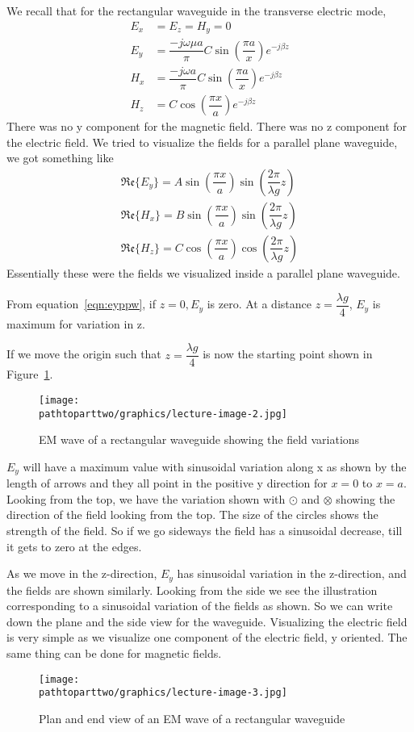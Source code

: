 We recall that for the rectangular waveguide in the transverse electric mode,
\begin{align*}
E_{x} &= E_{z} = H_{y} = 0\\
E_{y} &= \dfrac{-j\omega\mu a }{\pi} C\sin(\dfrac{\pi a}{x}) e ^{-j\beta z}\\
H_{x} &= \dfrac{-j\omega a}{\pi} C \sin(\dfrac{\pi a}{x})e^{-j\beta z} \\
H_{z} &= C\cos(\dfrac{\pi x}{a}) e^{-j\beta z}
\end{align*}
There was no y component for the magnetic field. There was no z component for the electric field. We tried to visualize the fields for a parallel plane waveguide, we got something like 
\begin{align}
\mathfrak{Re}\{E_{y}\} = A\sin(\dfrac{\pi x}{a})\sin(\dfrac{2\pi}{\lambda g}z)
\label{eqn:eyppw}\\
\mathfrak{Re}\{H_{x}\} = B\sin(\dfrac{\pi x}{a})\sin(\dfrac{2\pi}{\lambda g}z)\\
\mathfrak{Re}\{H_{z}\} = C\cos(\dfrac{\pi x}{a})\cos(\dfrac{2\pi}{\lambda g}z)
\end{align}
Essentially these were the fields we visualized inside a parallel plane waveguide.

From equation~\ref{eqn:eyppw}, if $z = 0, E_{y}$ is zero. At a distance $ z = \dfrac{\lambda g}{4}$, $E_{y}$ is maximum for variation in z.

If we move the origin such that $z = \dfrac{\lambda g}{4}$ is now the starting point shown in Figure~\ref{fig:lectureimage2}.
\begin{figure}[h]
\centering
\texttt{[image: \\pathtoparttwo/graphics/lecture-image-2.jpg]}
\label{fig:lectureimage2}
\caption{EM wave of a rectangular waveguide showing the field variations}
\end{figure}
$E_{y}$ will have a maximum value with sinusoidal variation along x as shown by the length of arrows and they all point in the positive y direction for $x = 0$ to $x = a$. Looking from the top, we have the variation shown with $\odot$ and $\otimes$ showing the direction of the field looking from the top. The size of the circles shows the strength of the field. So if we go sideways the field has a sinusoidal decrease, till it gets to zero at the edges.
 
As we move in the z-direction, $E_{y}$ has sinusoidal variation in the z-direction, and the fields are shown similarly. Looking from the side we see the illustration corresponding to a sinusoidal variation of the fields as shown. So we can write down the plane and the side view for the waveguide. Visualizing the electric field is very simple as we visualize one component of the electric field, y oriented. The same thing can be done for magnetic fields.
\begin{figure}[h]
\centering
\texttt{[image: \\pathtoparttwo/graphics/lecture-image-3.jpg]}
\label{fig:lectureimage3}
\caption{Plan and end view of an EM wave of a rectangular waveguide}
\end{figure}

